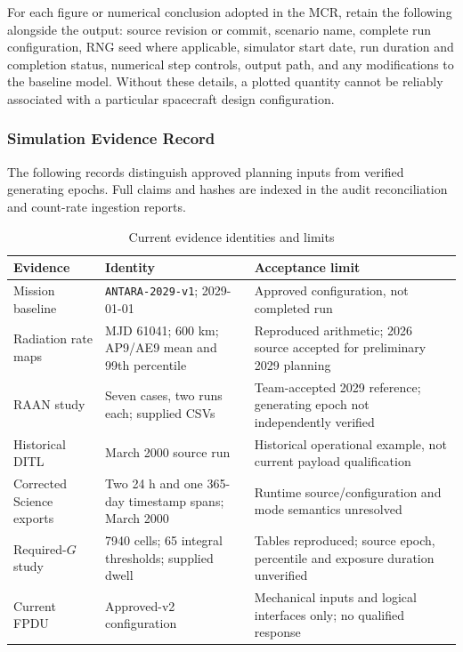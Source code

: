 For each figure or numerical conclusion adopted in the MCR, retain the following alongside the output: source revision or commit, scenario name, complete run configuration, RNG seed where applicable, simulator start date, run duration and completion status, numerical step controls, output path, and any modifications to the baseline model. Without these details, a plotted quantity cannot be reliably associated with a particular spacecraft design configuration.

\subsubsection{Simulation Evidence Record}
\label{app:evidence-record}
The following records distinguish approved planning inputs from verified generating epochs. Full claims and hashes are indexed in the audit reconciliation and count-rate ingestion reports.
\begin{table}[H]\centering\small
\caption{Current evidence identities and limits}\label{tab:evidence-record-template}
\begin{tabularx}{\linewidth}{@{}p{3cm}p{4cm}X@{}}\toprule
Evidence & Identity & Acceptance limit\\\midrule
Mission baseline & \texttt{ANTARA-2029-v1}; 2029-01-01 & Approved configuration, not completed run\\
Radiation rate maps & MJD 61041; 600 km; AP9/AE9 mean and 99th percentile & Reproduced arithmetic; 2026 source accepted for preliminary 2029 planning\\
RAAN study & Seven cases, two runs each; supplied CSVs & Team-accepted 2029 reference; generating epoch not independently verified\\
Historical DITL & March 2000 source run & Historical operational example, not current payload qualification\\
Corrected Science exports & Two 24 h and one 365-day timestamp spans; March 2000 & Runtime source/configuration and mode semantics unresolved\\
Required-$G$ study & 7940 cells; 65 integral thresholds; supplied dwell & Tables reproduced; source epoch, percentile and exposure duration unverified\\
Current FPDU & Approved-v2 configuration & Mechanical inputs and logical interfaces only; no qualified response\\\bottomrule
\end{tabularx}\end{table}

